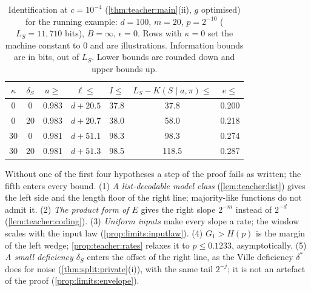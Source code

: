 \begin{table}[t]
\centering\small
\begin{tabular}{@{}cc|ccccc@{}}
\toprule
$\kappa$ & $\delta_S$ & $u\ge$ & $\ell\le$ & $I\le$ & $L_S-K(S\mid a,\pi)\le$ & $e\le$\\
\midrule
0 & 0 & 0.983 & $d+20.5$ & 37.8 & 37.8 & 0.200\\
0 & 20 & 0.983 & $d+20.7$ & 38.0 & 58.0 & 0.218\\
30 & 0 & 0.981 & $d+51.1$ & 98.3 & 98.3 & 0.274\\
30 & 20 & 0.981 & $d+51.3$ & 98.5 & 118.5 & 0.287\\
\bottomrule
\end{tabular}
\caption{Identification at $c=10^{-4}$ (\cref{thm:teacher:main}(ii), $g$ optimised) for the running example: $d=100$, $m=20$, $p=2^{-10}$ ($L_S=11{,}710$ bits), $B=\infty$, $\epsilon=0$. Rows with $\kappa=0$ set the machine constant to $0$ and are illustrations. Information bounds are in bits, out of $L_S$. Lower bounds are rounded down and upper bounds up.}
\label{tab:teacher:numbers}
\end{table}

\begin{remark}\label{rem:teacher:hypotheses}
Without one of the first four hypotheses a step of the proof fails as written; the fifth enters every bound. (1) \emph{A list-decodable model class} (\cref{lem:teacher:list}) gives the left side and the length floor of the right line; majority-like functions do not admit it. (2) \emph{The product form of $E$} gives the right slope $2^{-m}$ instead of $2^{-d}$ (\cref{lem:teacher:coding}). (3) \emph{Uniform inputs} make every slope a rate; the window scales with the input law (\cref{prop:limits:inputlaw}). (4) \emph{$G_1>H(p)$} is the margin of the left wedge; \cref{prop:teacher:rates} relaxes it to $p\le0.1233$, asymptotically. (5) \emph{A small deficiency $\delta_S$} enters the offset of the right line, as the Ville deficiency $\delta^*$ does for noise (\cref{thm:split:private}(i)), with the same tail $2^{-j}$; it is not an artefact of the proof (\cref{prop:limits:envelope}).
\end{remark}


